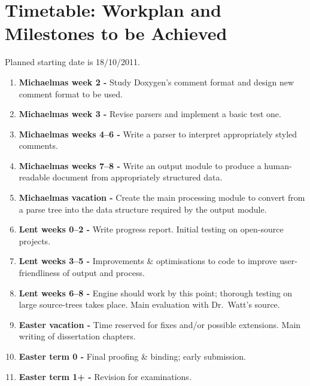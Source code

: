 \section{Timetable: Workplan and Milestones to be Achieved}

Planned starting date is 18/10/2011.

\begin{enumerate}

\item {\bf Michaelmas week 2 -} Study Doxygen's comment format and
  design new comment format to be used.

\item {\bf Michaelmas week 3 -} Revise parsers and implement a basic
  test one.

\item {\bf Michaelmas weeks 4--6 -} Write a parser to interpret
  appropriately styled comments.

\item {\bf Michaelmas weeks 7--8 -} Write an output module to produce a
  human-readable document from appropriately structured data.

\item {\bf Michaelmas vacation -} Create the main processing module to
  convert from a parse tree into the data structure required by the
  output module.

\item {\bf Lent weeks 0--2 -} Write progress report. Initial testing on
  open-source projects.

\item {\bf Lent weeks 3--5 -} Improvements \& optimisations to code to
  improve user-friendliness of output and process.

\item {\bf Lent weeks 6--8 -} Engine should work by this point; thorough
  testing on large source-trees takes place. Main evaluation with Dr.~Watt's source.

\item {\bf Easter vacation -} Time reserved for fixes and/or possible
  extensions. Main writing of dissertation chapters.

\item {\bf Easter term 0 -} Final proofing \& binding; early submission.

\item {\bf Easter term 1+ -} Revision for examinations.

\end{enumerate}


 

